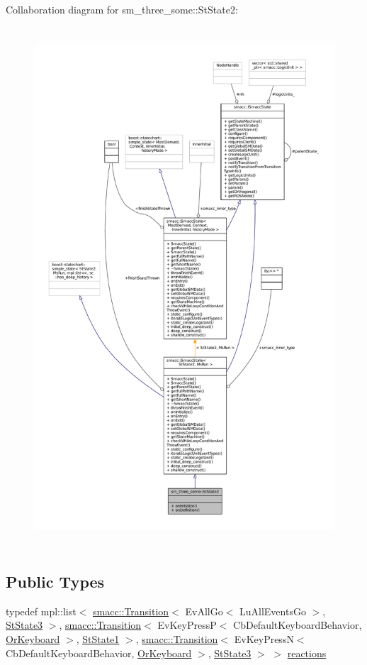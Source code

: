 Collaboration diagram for sm\+\_\+three\+\_\+some\+:\+:St\+State2\+:
\nopagebreak
\begin{figure}[H]
\begin{center}
\leavevmode
\includegraphics[height=550pt]{structsm__three__some_1_1StState2__coll__graph}
\end{center}
\end{figure}
\subsection*{Public Types}
\begin{DoxyCompactItemize}
\item 
typedef mpl\+::list$<$ \hyperlink{classsmacc_1_1Transition}{smacc\+::\+Transition}$<$ Ev\+All\+Go$<$ Lu\+All\+Events\+Go $>$, \hyperlink{structsm__three__some_1_1StState3}{St\+State3} $>$, \hyperlink{classsmacc_1_1Transition}{smacc\+::\+Transition}$<$ Ev\+Key\+PressP$<$ Cb\+Default\+Keyboard\+Behavior, \hyperlink{classsm__three__some_1_1OrKeyboard}{Or\+Keyboard} $>$, \hyperlink{structsm__three__some_1_1StState1}{St\+State1} $>$, \hyperlink{classsmacc_1_1Transition}{smacc\+::\+Transition}$<$ Ev\+Key\+PressN$<$ Cb\+Default\+Keyboard\+Behavior, \hyperlink{classsm__three__some_1_1OrKeyboard}{Or\+Keyboard} $>$, \hyperlink{structsm__three__some_1_1StState3}{St\+State3} $>$ $>$ \hyperlink{structsm__three__some_1_1StState2_a84ae1c97ec7653195444d6a17095187f}{reactions}
\end{DoxyCompactItemize}
